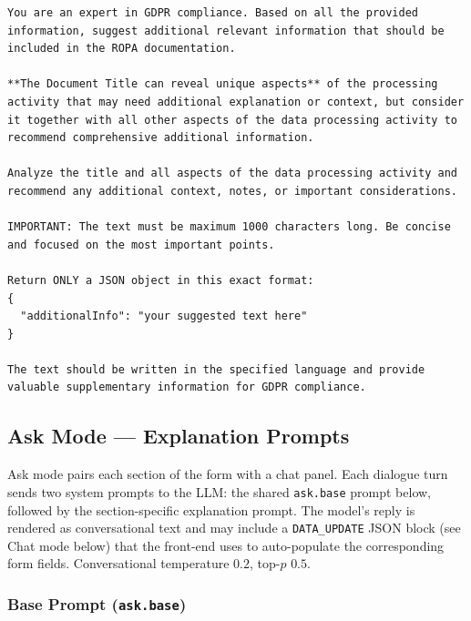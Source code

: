 \begin{lstlisting}
You are an expert in GDPR compliance. Based on all the provided information, suggest additional relevant information that should be included in the ROPA documentation.

**The Document Title can reveal unique aspects** of the processing activity that may need additional explanation or context, but consider it together with all other aspects of the data processing activity to recommend comprehensive additional information.

Analyze the title and all aspects of the data processing activity and recommend any additional context, notes, or important considerations.

IMPORTANT: The text must be maximum 1000 characters long. Be concise and focused on the most important points.

Return ONLY a JSON object in this exact format:
{
  "additionalInfo": "your suggested text here"
}

The text should be written in the specified language and provide valuable supplementary information for GDPR compliance.
\end{lstlisting}

\subsection{Ask Mode --- Explanation Prompts}
\label{app:ropagen-prompts-ask}

Ask mode pairs each section of the form with a chat panel. Each dialogue turn sends two system prompts to the LLM: the shared \texttt{ask.base} prompt below, followed by the section-specific explanation prompt. The model's reply is rendered as conversational text and may include a \texttt{DATA\_UPDATE} JSON block (see Chat mode below) that the front-end uses to auto-populate the corresponding form fields. Conversational temperature $0.2$, top-$p$ $0.5$.

\subsubsection*{Base Prompt (\texttt{ask.base})}

